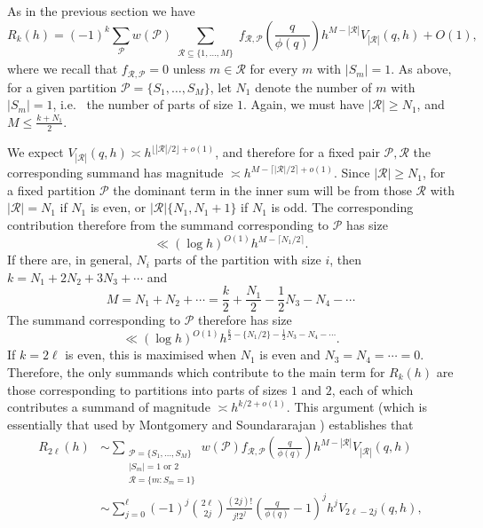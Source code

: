 \documentclass[11pt,letterpaper]{amsart}
\newcommand{\abs}[1]{\left\lvert #1\right\rvert}
\theoremstyle{definition}
\begin{document}
As in the previous section we have
\begin{equation*}
R_k(h) = (-1)^{k}\sum_{\mathcal P} w(\mathcal P) \sum_{\substack{\mathcal R \subseteq \{1, \dots, M\}}} f_{\mathcal R,\mathcal P}\left(\frac{q}{\phi(q)}\right) h^{M-|\mathcal R|} V_{|\mathcal R|}(q,h)  + O(1),
\end{equation*}
where we recall that $f_{\mathcal R, \mathcal P} = 0$
unless $m \in \mathcal R$ for every $m$ with $|S_m| = 1$. As above, for a given partition $\mathcal P = \{S_1, \dots, S_M\}$, let $N_1$ denote the number of $m$ with $|S_m| = 1$, i.e.~ the number of parts of size $1$. Again, we must have $|\mathcal R| \ge N_1$, and $M \le \frac{k+N_1}{2}$.

We expect $V_{\abs{\mathcal{R}}}(q,h)\asymp h^{\lfloor \abs{\mathcal{R}}/2\rfloor+o(1)}$, and therefore for a fixed pair $\mathcal{P},\mathcal{R}$ the corresponding summand has magnitude $\asymp  h^{M-\lceil\lvert\mathcal R\rvert/2\rceil+o(1)}$. Since $\lvert \mathcal{R}\rvert \geq N_1$, for a fixed partition $\mathcal P$ the dominant term in the inner sum will be from those $\mathcal{R}$ with $\lvert \mathcal{R}\rvert=N_1$ if $N_1$ is even, or $\lvert \mathcal{R}\rvert\{N_1,N_1+1\}$ if $N_1$ is odd. The corresponding contribution therefore from the summand corresponding to $\mathcal{P}$ has size
\begin{equation*}
\ll (\log h)^{O(1)}h^{M-\lceil N_1/2\rceil}.
\end{equation*}
If there are, in general, $N_i$ parts of the partition with size $i$, then $k=N_1+2N_2+3N_3+\cdots$ and 
\[M=N_1+N_2+\cdots=\frac{k}{2}+\frac{N_1}{2}-\frac{1}{2}N_3-N_4-\cdots\]
The summand corresponding to $\mathcal{P}$ therefore has size
\begin{equation}\label{eq-pterm}
\ll (\log h)^{O(1)}h^{\frac{k}{2}-\{ N_1/2\}-\frac{1}{2}N_3-N_4-\cdots}.
\end{equation}
If $k=2\ell$ is even, this is maximised when $N_1$ is even and $N_3=N_4=\cdots=0$. Therefore, the only summands which contribute to the main term for $R_k(h)$ are those corresponding to partitions into parts of sizes $1$ and $2$, each of which contributes a summand of magnitude $\asymp h^{k/2+o(1)}$. This argument (which is essentially that used by Montgomery and Soundararajan \cite{MS04}) establishes that
\begin{align*}
R_{2\ell}(h) &\sim \sum_{\substack{\mathcal P = \{S_1, \dots, S_M\} \\ |S_m| = 1 \text{ or } 2 \\ \mathcal R = \{m:S_m = 1\}}} w(\mathcal P) f_{\mathcal R,\mathcal P}\left(\frac{q}{\phi(q)}\right) h^{M-|\mathcal R|} V_{|\mathcal R|}(q,h) \\
&\sim \sum_{j=0}^{\ell} (-1)^j \binom{2\ell}{2j}\frac{(2j)!}{j!2^j} \left(\frac{q}{\phi(q)}-1\right)^{j} h^{j}V_{2\ell-2j}(q,h),
\end{align*}
\end{document}
